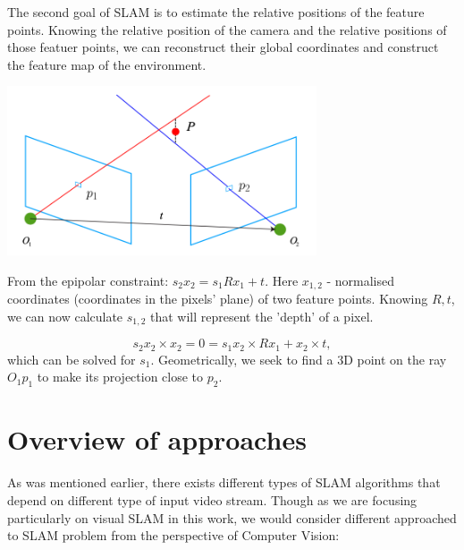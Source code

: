 The second goal of SLAM is to estimate the relative positions of the feature points. Knowing the relative position of the camera and the relative positions of those featuer points, we can reconstruct their global coordinates and construct the feature map of the environment. 

\begin{center}
    \includegraphics[height=5cm]{triangulation.png}\\[1cm]
\end{center}

From the epipolar constraint: $s_{2} x_{2} = s_{1} R x_{1} + t$. Here $x_{1, 2}$ - normalised coordinates (coordinates in the pixels' plane) of two feature points. Knowing $R, t$, we can now calculate $s_{1, 2}$ that will represent the 'depth' of a pixel. 

\begin{equation}
    s_{2} x_{2} \times x_{2} = 0 = s_{1} x_{2} \times R x_{1} + x_{2} \times t,
\end{equation}
which can be solved for $s_{1}$. Geometrically, we seek to find a 3D point on the ray $O_{1}p_{1}$ to make its projection close to $p_{2}$.

\section{Overview of approaches}
As was mentioned earlier, there exists different types of SLAM algorithms that depend on different type of input video stream. Though as we are focusing particularly on visual SLAM in this work, we would consider different approached to SLAM problem from the perspective of Computer Vision:


